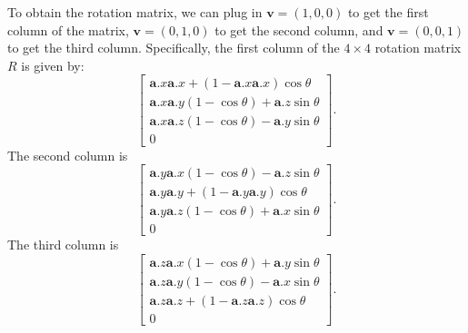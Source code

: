 To obtain the rotation matrix, we can plug in $\mathbf{v}=(1, 0, 0)$ to get the first column of the matrix, $\mathbf{v}=(0, 1, 0)$ to get the second column, and $\mathbf{v}=(0, 0, 1)$ to get the third column. Specifically, the first column of the $4\times4$ rotation matrix $R$ is given by:
\begin{equation}
\begin{bmatrix}
\mathbf{a}.x \mathbf{a}.x + (1 - \mathbf{a}.x \mathbf{a}.x) \cos\theta \\
\mathbf{a}.x \mathbf{a}.y (1 - \cos\theta) + \mathbf{a}.z \sin\theta \\
\mathbf{a}.x \mathbf{a}.z (1 - \cos\theta) - \mathbf{a}.y \sin\theta \\
0 
\end{bmatrix}.
\end{equation}
The second column is
\begin{equation}
\begin{bmatrix}
\mathbf{a}.y \mathbf{a}.x (1 - \cos\theta) - \mathbf{a}.z \sin\theta \\
\mathbf{a}.y \mathbf{a}.y + (1 - \mathbf{a}.y \mathbf{a}.y) \cos\theta \\
\mathbf{a}.y \mathbf{a}.z (1 - \cos\theta) + \mathbf{a}.x \sin\theta \\
0
\end{bmatrix}.
\end{equation}
The third column is
\begin{equation}
\begin{bmatrix}
\mathbf{a}.z \mathbf{a}.x (1 - \cos\theta) + \mathbf{a}.y \sin\theta \\
\mathbf{a}.z \mathbf{a}.y (1 - \cos\theta) - \mathbf{a}.x \sin\theta \\
\mathbf{a}.z \mathbf{a}.z + (1 - \mathbf{a}.z\mathbf{a}.z) \cos\theta \\
0
\end{bmatrix}.
\end{equation}


